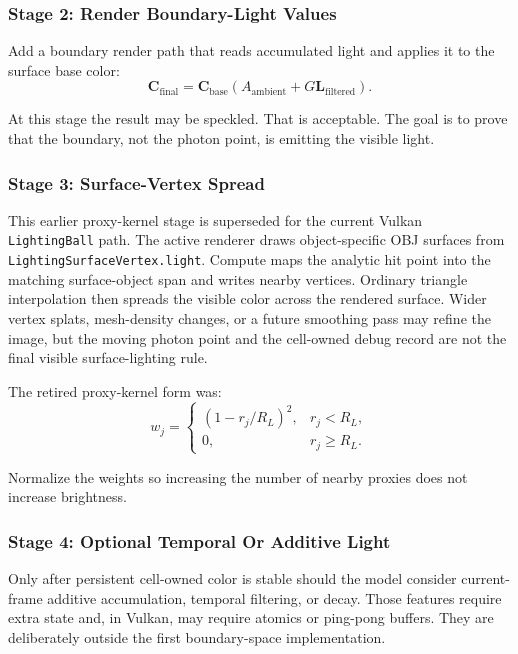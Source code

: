 \subsubsection{Stage 2: Render Boundary-Light Values}

Add a boundary render path that reads accumulated light and applies it to the
surface base color:
\[
    \mathbf C_{\mathrm{final}} =
    \mathbf C_{\mathrm{base}}
    \left(A_{\mathrm{ambient}} + G\mathbf L_{\mathrm{filtered}}\right).
\]

At this stage the result may be speckled.  That is acceptable.  The goal is to
prove that the boundary, not the photon point, is emitting the visible light.

\subsubsection{Stage 3: Surface-Vertex Spread}

This earlier proxy-kernel stage is superseded for the current Vulkan
\texttt{LightingBall} path.  The active renderer draws object-specific OBJ
surfaces from \texttt{LightingSurfaceVertex.light}.  Compute maps the
analytic hit point into the matching surface-object span and writes nearby
vertices.  Ordinary triangle interpolation then spreads the visible color
across the rendered surface.  Wider vertex splats, mesh-density changes, or a
future smoothing pass may refine the image, but the moving photon point and
the cell-owned debug record are not the final visible surface-lighting rule.

The retired proxy-kernel form was:
\[
    w_j =
    \begin{cases}
        (1-r_j/R_L)^2, & r_j < R_L,\\
        0, & r_j \ge R_L.
    \end{cases}
\]

Normalize the weights so increasing the number of nearby proxies does not
increase brightness.

\subsubsection{Stage 4: Optional Temporal Or Additive Light}

Only after persistent cell-owned color is stable should the model consider
current-frame additive accumulation, temporal filtering, or decay.  Those
features require extra state and, in Vulkan, may require atomics or ping-pong
buffers.  They are deliberately outside the first boundary-space
implementation.

